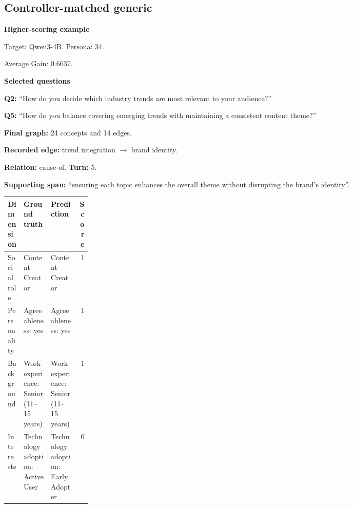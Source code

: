 \documentclass{ieeeaccess}
\begin{document}
\begin{multicols*}{2}
\subsection{Controller-matched generic}
\par\medskip\noindent\begin{minipage}{\linewidth}
\textbf{Higher-scoring example}\par
\noindent Target: Qwen3-4B. Persona: 34.\par
\noindent Average Gain: $0.6637$.\par\smallskip
\noindent\textbf{Selected questions}\par
\noindent\textbf{Q2:} ``How do you decide which industry trends are most relevant to your audience?''\par
\noindent\textbf{Q5:} ``How do you balance covering emerging trends with maintaining a consistent content theme?''\par\smallskip
\noindent\textbf{Final graph:} 24 concepts and 14 edges.\par
\noindent\textbf{Recorded edge:} trend integration $\rightarrow$ brand identity.\par
\noindent\textbf{Relation:} cause-of. \textbf{Turn:} 5.\par
\noindent\textbf{Supporting span:} ``ensuring each topic enhances the overall theme without disrupting the brand's identity''.\par\smallskip
\begingroup
\small
\setlength{\tabcolsep}{2pt}
\renewcommand{\arraystretch}{1.12}
\noindent\begin{tabularx}{\linewidth}{@{}p{0.19\linewidth}>{\raggedright\arraybackslash}X>{\raggedright\arraybackslash}Xr@{}}
\toprule
Dimension & Ground truth & Prediction & Score \\
\midrule
Social role & Content Creator & Content Creator & 1 \\
\addlinespace[2pt]
Personality & Agreeableness: yes & Agreeableness: yes & 1 \\
\addlinespace[2pt]
Background & Work experience: Senior (11--15 years) & Work experience: Senior (11--15 years) & 1 \\
\addlinespace[2pt]
Interests & Technology adoption: Active User & Technology adoption: Early Adopter & 0 \\
\bottomrule
\end{tabularx}\par
\endgroup
\end{minipage}\par\medskip


\end{multicols*}
\end{document}
